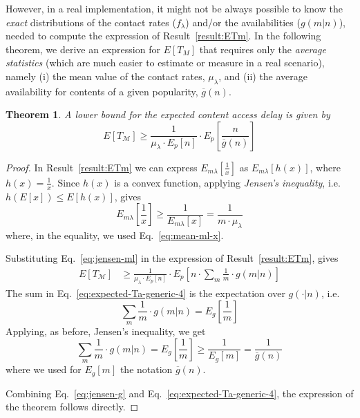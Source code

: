 \documentclass[journal]{IEEEtran}
\newtheorem{theorem}{Theorem}\newtheorem{definition}{Definition}
\newcommand{\eq}[1]{Eq.~\eqref{#1}}
\begin{document}
However, in a real implementation, it might not be always possible to know the \textit{exact} distributions of the contact rates ($f_{\lambda}$) and/or the availabilities ($g(m|n)$), needed to compute the expression of Result~\ref{result:ETm}. In the following theorem, we derive an expression for $E[T_{M}]$ that requires only the \textit{average statistics} (which are much easier to estimate or measure in a real scenario), namely (i) the mean value of the contact rates, $\mu_{\lambda}$, and (ii) the average availability for contents of a given popularity, $\overline{g}(n)$. 
\begin{theorem}\label{thm:lower-bound-ETm}
A lower bound for the expected content access delay is given by
\begin{equation}
E[T_{\mathcal{M}}]\geq \frac{1}{\mu_{\lambda}\cdot E_{p}[n]}\cdot E_{p}\left[\frac{n}{\overline{g}(n)}\right]\nonumber
\end{equation}
\end{theorem}
\begin{proof}
In Result~\ref{result:ETm} we can express $E_{m\lambda}\left[\frac{1}{x}\right]$ as $E_{m\lambda}[h(x)]$, where $h(x)=\frac{1}{x}$. Since $h(x)$ is a convex function, applying \emph{Jensen's inequality}, i.e. $h\left(E[x]\right)\leq E[h(x)]$, gives
\begin{equation}\label{eq:jensen-ml}
E_{m\lambda}\left[\frac{1}{x}\right]\geq \frac{1}{E_{m\lambda}[x]} = \frac{1}{m\cdot \mu_{\lambda}}
\end{equation}
where, in the equality, we used \eq{eq:mean-ml-x}.

Substituting \eq{eq:jensen-ml} in the expression of Result~\ref{result:ETm}, gives
\begin{align}\label{eq:expected-Ta-generic-4}
E[T_{\mathcal{M}}] 	&\geq	\frac{1}{ \mu_{\lambda}\cdot E_{p}[n]}\cdot E_{p}\left[n\cdot\sum_{m} \frac{1}{m} \cdot  g(m|n)\right]			
\end{align}
The sum in \eq{eq:expected-Ta-generic-4} is the expectation over $g(\cdot|n)$, i.e.
\begin{equation}
\sum_{m} \frac{1}{m} \cdot  g(m|n) = E_{g}\left[\frac{1}{m}\right]
\end{equation}
Applying, as before, Jensen's inequality, we get
\begin{equation}\label{eq:jensen-g}
\sum_{m} \frac{1}{m} \cdot  g(m|n) = E_{g}\left[\frac{1}{m}\right]\geq \frac{1}{E_{g}[m]}=\frac{1}{\overline{g}(n)}
\end{equation}
where we used for $E_{g}[m]$ the notation $\overline{g}(n)$.

Combining \eq{eq:jensen-g} and \eq{eq:expected-Ta-generic-4}, the expression of the theorem follows directly.
\end{proof}
\end{document}
